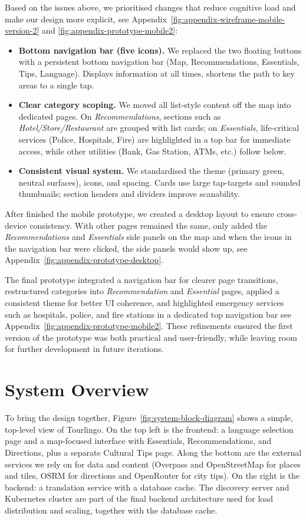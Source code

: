 Based on the issues above, we prioritised changes that reduce cognitive load and make our design more explicit, see Appendix~\ref{fig:appendix-wireframe-mobile-version-2} and \ref{fig:appendix-prototype-mobile2}:

\begin{itemize}
    \item \textbf{Bottom navigation bar (five icons).} We replaced the two floating buttons with a persistent bottom navigation bar (Map, Recommendations, Essentials, Tips, Language). Displays information at all times, shortens the path to key areas to a single tap. 
     \item \textbf{Clear category scoping.} We moved all list-style content off the map into dedicated pages. On \emph{Recommendations}, sections such as \emph{Hotel/Store/Restaurant} are grouped with list cards; on \emph{Essentials}, life-critical services (Police, Hospitals, Fire) are highlighted in a top bar for immediate access, while other utilities (Bank, Gas Station, ATMs, etc.) follow below. 
     \item \textbf{Consistent visual system.} We standardised the theme (primary green, neutral surfaces), icons, and spacing. Cards use large tap-targets and rounded thumbnails; section headers and dividers improve scanability.
\end{itemize}

After finished the mobile prototype, we created a desktop layout to ensure cross-device consistency. With other pages remained the same, only added the \emph{Recommendations} and \emph{Essentials} side panels on the map and when the icons in the navigation bar were clicked, the side panels would show up, see Appendix~\ref{fig:appendix-prototype-desktop}.

The final prototype integrated a navigation bar for clearer page transitions, restructured categories into \textit{Recommendation} and \textit{Essential} pages, applied a consistent theme for better UI coherence, and highlighted emergency services such as hospitals, police, and fire stations in a dedicated top navigation bar see Appendix~\ref{fig:appendix-prototype-mobile2}. These refinements ensured the first version of the prototype was both practical and user-friendly, while leaving room for further development in future iterations.

\section{System Overview}
To bring the design together, Figure~\ref{fig:system-block-diagram} shows a simple, top-level view of Tourlingo. On the top left is the frontend: a language selection page and a map-focused interface with Essentials, Recommendations, and Directions, plus a separate Cultural Tips page. Along the bottom are the external services we rely on for data and content (Overpass and OpenStreetMap for places and tiles, OSRM for directions and OpenRouter for city tips). On the right is the backend: a translation service with a database cache. The discovery server and Kubernetes cluster are part of the final backend architecture used for load distribution and scaling, together with the database cache.

